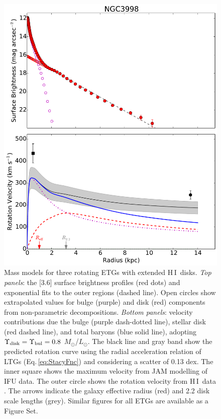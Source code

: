 \documentclass[apjl, twocolappendix]{emulateapj}
\newcommand{\hi } {{\rm H}\,{\small\rm I} \,}
\begin{document}
\begin{figure}
\begin{minipage}{0.32\textwidth}
\end{minipage}
\begin{minipage}{0.32\textwidth}
\centering
\includegraphics[width=\textwidth]{NGC3998_MassModel.pdf}
\end{minipage}
\caption{Mass models for three rotating ETGs with extended \hi disks. \textit{Top panels}: the [3.6] surface brightness profiles (red dots) and exponential fits to the outer regions (dashed line). Open circles show extrapolated values for bulge (purple) and disk (red) components from non-parametric decompositions. \textit{Bottom panels}: velocity contributions due the bulge (purple dash-dotted line), stellar disk (red dashed line), and total baryons (blue solid line), adopting $\Upsilon_{\rm disk} = \Upsilon_{\rm bul} = 0.8$ $M_{\odot}$/$L_{\odot}$. The black line and gray band show the predicted rotation curve using the radial acceleration relation of LTGs (Eq.\,\ref{eq:StacyFnc}) and considering a scatter of 0.13 dex. The inner square shows the maximum velocity from JAM modelling of IFU data. The outer circle shows the rotation velocity from \hi data \citep{denHeijer2015}. The arrows indicate the galaxy effective radius (red) and 2.2 disk scale lengths (grey). Similar figures for all ETGs are available as a Figure Set.}
\label{fig:massmodels}
\end{figure}
\end{document}
